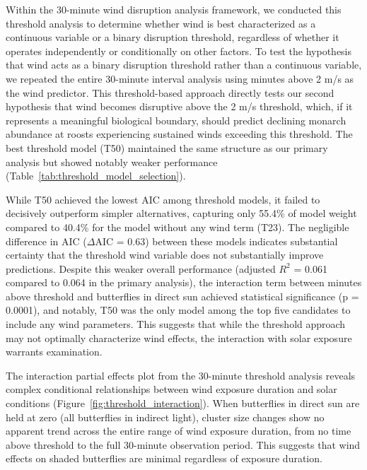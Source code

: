 Within the 30-minute wind disruption analysis framework, we conducted this threshold analysis to determine whether wind is best characterized as a continuous variable or a binary disruption threshold, regardless of whether it operates independently or conditionally on other factors. To test the hypothesis that wind acts as a binary disruption threshold rather than a continuous variable, we repeated the entire 30-minute interval analysis using minutes above 2 m/s as the wind predictor. This threshold-based approach directly tests our second hypothesis that wind becomes disruptive above the 2 m/s threshold, which, if it represents a meaningful biological boundary, should predict declining monarch abundance at roosts experiencing sustained winds exceeding this threshold. The best threshold model (T50) maintained the same structure as our primary analysis but showed notably weaker performance (Table~\ref{tab:threshold_model_selection}).

While T50 achieved the lowest AIC among threshold models, it failed to decisively outperform simpler alternatives, capturing only 55.4\% of model weight compared to 40.4\% for the model without any wind term (T23). The negligible difference in AIC ($\Delta$AIC = 0.63) between these models indicates substantial certainty that the threshold wind variable does not substantially improve predictions. Despite this weaker overall performance (adjusted $R^2$ = 0.061 compared to 0.064 in the primary analysis), the interaction term between minutes above threshold and butterflies in direct sun achieved statistical significance (p = 0.0001), and notably, T50 was the only model among the top five candidates to include any wind parameters. This suggests that while the threshold approach may not optimally characterize wind effects, the interaction with solar exposure warrants examination.



The interaction partial effects plot from the 30-minute threshold analysis reveals complex conditional relationships between wind exposure duration and solar conditions (Figure~\ref{fig:threshold_interaction}). When butterflies in direct sun are held at zero (all butterflies in indirect light), cluster size changes show no apparent trend across the entire range of wind exposure duration, from no time above threshold to the full 30-minute observation period. This suggests that wind effects on shaded butterflies are minimal regardless of exposure duration.


